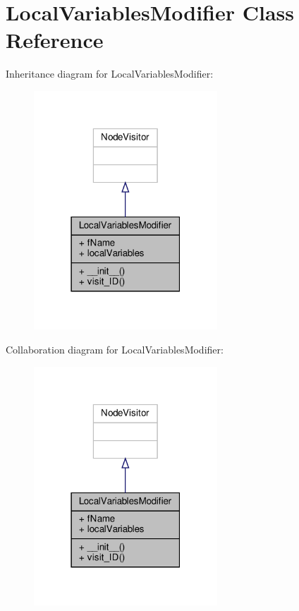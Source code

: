 \hypertarget{classVisitors_1_1LocalVariablesModifier}{}\section{Local\+Variables\+Modifier Class Reference}
\label{classVisitors_1_1LocalVariablesModifier}


Inheritance diagram for Local\+Variables\+Modifier\+:\nopagebreak
\begin{figure}[H]
\begin{center}
\leavevmode
\includegraphics[width=195pt]{classVisitors_1_1LocalVariablesModifier__inherit__graph}
\end{center}
\end{figure}


Collaboration diagram for Local\+Variables\+Modifier\+:\nopagebreak
\begin{figure}[H]
\begin{center}
\leavevmode
\includegraphics[width=195pt]{classVisitors_1_1LocalVariablesModifier__coll__graph}
\end{center}
\end{figure}

